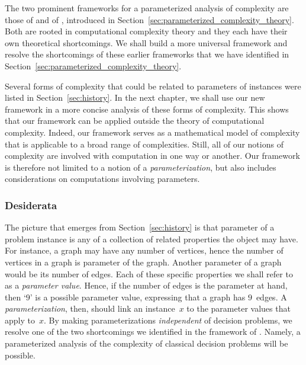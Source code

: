 \label{sec:framework}%

The two prominent frameworks for a parameterized analysis of complexity are those of \citeauthor{downey1999parameterized} and of \citeauthor{flum2006parameterized}, introduced in Section~\ref{sec:parameterized_complexity_theory}.
Both are rooted in computational complexity theory and they each have their own theoretical shortcomings.
We shall build a more universal framework and resolve the shortcomings of these earlier frameworks that we have identified in Section~\ref{sec:parameterized_complexity_theory}.

Several forms of complexity that could be related to parameters of instances were listed in Section~\ref{sec:history}.
In the next chapter, we shall use our new framework in a more concise analysis of these forms of complexity.
This shows that our framework can be applied outside the theory of computational complexity.
Indeed, our framework serves as a mathematical model of complexity that is applicable to a broad range of complexities.
Still, all of our notions of complexity are involved with computation in one way or another.
Our framework is therefore not limited to a notion of a \emph{parameterization}, but also includes considerations on computations involving parameters.

\subsubsection{Desiderata}
The picture that emerges from Section~\ref{sec:history} is that parameter of a problem instance is any of a collection of related properties the object may have.
For instance, a graph may have any number of vertices, hence the number of vertices in a graph is parameter of the graph.
Another parameter of a graph would be its number of edges.
Each of these specific properties we shall refer to as a \emph{parameter value}.
Hence, if the number of edges is the parameter at hand, then `$9$' is a possible parameter value, expressing that a graph has $9$~edges.
A \emph{parameterization}, then, should link an instance~$x$ to the parameter values that apply to~$x$.
By making parameterizations \emph{independent} of decision problems, we resolve one of the two shortcomings we identified in the framework of \citeauthor{downey1999parameterized}.
Namely, a parameterized analysis of the complexity of classical decision problems will be possible.


